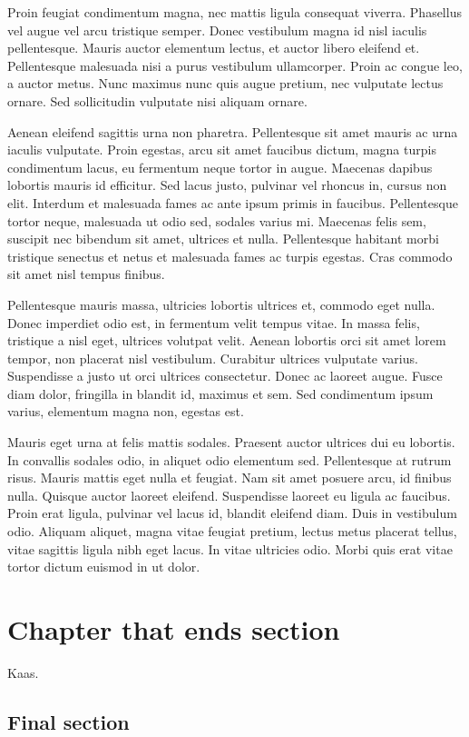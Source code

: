 \documentclass[11pt]{article}
\begin{document}
    Proin feugiat condimentum magna, nec mattis ligula consequat viverra. Phasellus vel augue vel arcu tristique semper. Donec vestibulum magna id nisl iaculis pellentesque. Mauris auctor elementum lectus, et auctor libero eleifend et. Pellentesque malesuada nisi a purus vestibulum ullamcorper. Proin ac congue leo, a auctor metus. Nunc maximus nunc quis augue pretium, nec vulputate lectus ornare. Sed sollicitudin vulputate nisi aliquam ornare.

    Aenean eleifend sagittis urna non pharetra. Pellentesque sit amet mauris ac urna iaculis vulputate. Proin egestas, arcu sit amet faucibus dictum, magna turpis condimentum lacus, eu fermentum neque tortor in augue. Maecenas dapibus lobortis mauris id efficitur. Sed lacus justo, pulvinar vel rhoncus in, cursus non elit. Interdum et malesuada fames ac ante ipsum primis in faucibus. Pellentesque tortor neque, malesuada ut odio sed, sodales varius mi. Maecenas felis sem, suscipit nec bibendum sit amet, ultrices et nulla. Pellentesque habitant morbi tristique senectus et netus et malesuada fames ac turpis egestas. Cras commodo sit amet nisl tempus finibus.

    Pellentesque mauris massa, ultricies lobortis ultrices et, commodo eget nulla. Donec imperdiet odio est, in fermentum velit tempus vitae. In massa felis, tristique a nisl eget, ultrices volutpat velit. Aenean lobortis orci sit amet lorem tempor, non placerat nisl vestibulum. Curabitur ultrices vulputate varius. Suspendisse a justo ut orci ultrices consectetur. Donec ac laoreet augue. Fusce diam dolor, fringilla in blandit id, maximus et sem. Sed condimentum ipsum varius, elementum magna non, egestas est.

    Mauris eget urna at felis mattis sodales. Praesent auctor ultrices dui eu lobortis. In convallis sodales odio, in aliquet odio elementum sed. Pellentesque at rutrum risus. Mauris mattis eget nulla et feugiat. Nam sit amet posuere arcu, id finibus nulla. Quisque auctor laoreet eleifend. Suspendisse laoreet eu ligula ac faucibus. Proin erat ligula, pulvinar vel lacus id, blandit eleifend diam. Duis in vestibulum odio. Aliquam aliquet, magna vitae feugiat pretium, lectus metus placerat tellus, vitae sagittis ligula nibh eget lacus. In vitae ultricies odio. Morbi quis erat vitae tortor dictum euismod in ut dolor.

    \chapter{Chapter that ends section}
    Kaas.
    \section{Final section}
\end{document}
